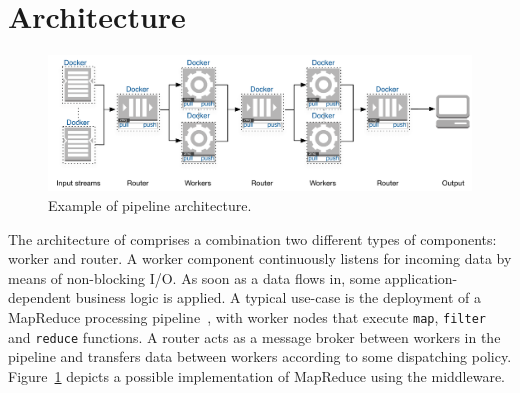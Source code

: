 \section{Architecture}
\label{sec:architecture}
\begin{figure}[!t]
  \centering
  \includegraphics[scale=0.7]{images/architecture_pipeline}
  \caption{Example of \SYS pipeline architecture.}
  \label{fig:architecture_pipeline}
\end{figure}


The architecture of \SYS{} comprises a combination two different types of components: \textsf{worker} and \textsf{router}.
A worker component continuously listens for incoming data by means of non-blocking I/O.
As soon as a data flows in, some application-dependent business logic is applied.
A typical use-case is the deployment of a MapReduce processing pipeline~\cite{Dean:2008:MSD:1327452.1327492}, with worker nodes that execute \texttt{map}, \texttt{filter} and \texttt{reduce} functions.
A router acts as a message broker between workers in the pipeline and transfers data between workers according to some dispatching policy.
Figure~\ref{fig:architecture_pipeline} depicts a possible implementation of MapReduce using the \SYS middleware.

